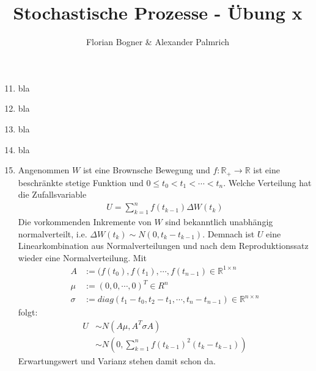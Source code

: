 \documentclass[a4paper,11pt,notitlepage,fullpage]{article}
\newcommand{\R}{\mathbb R}
\begin{document}
\author{Florian Bogner \& Alexander Palmrich}
\title{Stochastische Prozesse - Übung x}
\maketitle

\begin{enumerate}
\setcounter{enumi}{10}

\item bla

\item bla

\item bla

\item bla

\item Angenommen $W$ ist eine Brownsche Bewegung und $f: \R_+ \to \R$ ist eine beschränkte stetige Funktion und $0 \leq t_0 < t_1 < \cdots < t_n$. Welche Verteilung hat die Zufallsvariable
\begin{align*}
U = \sum_{k=1}^n f(t_{k-1})\Delta W(t_k)
\end{align*}
Die vorkommenden Inkremente von $W$ sind bekanntlich unabhängig normalverteilt, i.e. $\Delta W(t_k) \sim N(0, t_k - t_{k-1})$. Demnach ist $U$ eine Linearkombination aus Normalverteilungen und nach dem Reproduktionssatz wieder eine Normalverteilung. Mit
\begin{align*}
A &:= (f(t_0), f(t_1), \cdots, f(t_{n-1}) \in \R^{1\times n} \\
\mu &:= (0, 0, \cdots, 0)^T \in R^n \\
\sigma &:= diag(t_1 - t_0, t_2 - t_1, \cdots, t_n - t_{n-1}) \in \R^{n\times n}
\end{align*}
folgt:
\begin{align*}
U &\sim N\left(A\mu, A^T \sigma A\right) \\
&\sim N\left(0, \sum_{k=1}^n f(t_{k-1})^2(t_k - t_{k-1})\right)
\end{align*}
Erwartungswert und Varianz stehen damit schon da.


\end{enumerate}
\end{document}
